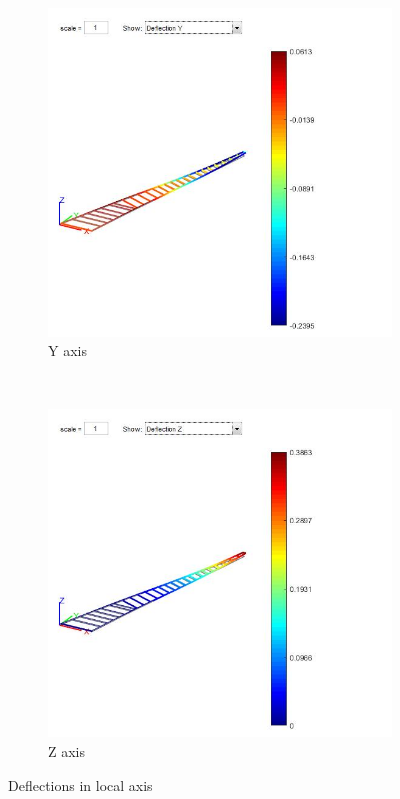\begin{figure}[h]
	\centering
	\begin{subfigure}{0.45\textwidth}
		\includegraphics[width=\textwidth]{img/DeflectionY.jpg}
		\caption{Y axis}
		\label{fig:defl_y}
	\end{subfigure}
	~ %
	\begin{subfigure}{0.45\textwidth}
		\includegraphics[width=\textwidth]{img/DeflectionZ.jpg}
		\caption{Z axis}
		\label{fig:defl_z}
	\end{subfigure}
	\caption{Deflections in local axis}
	\label{fig:deflections}
\end{figure}

